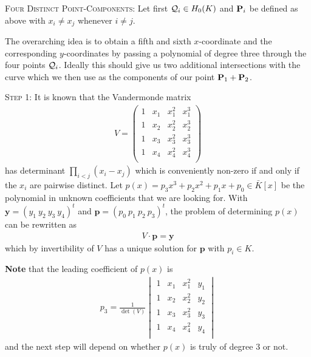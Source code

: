 \documentclass[english,11pt,a4paper]{article}
\begin{document}
\begin{case} {\scshape Four Distinct Point-Components:}
	Let first $\q_i \in \enk$ and $\P_i$ be defined as above with $x_i \neq x_j$ whenever $i \neq j$.

	The overarching idea is to obtain a fifth and sixth $x$-coordinate and the corresponding $y$-coordinates by passing a polynomial of degree three through the four points $\q_i$. Ideally this should give us two additional intersections with the curve which we then use as the components of our point $\P_1 + \P_2$.

	{\scshape Step 1:} It is known that the Vandermonde matrix
	\begin{align*}V=
		\begin{pmatrix}
			1 & x_1 & x_1^2 & x_1^3\\
			1 & x_2 & x_2^2 & x_2^3\\
			1 & x_3 & x_3^2 & x_3^3\\
			1 & x_4 & x_4^2 & x_4^3\\
		\end{pmatrix}
	\end{align*}
	has determinant $\prod_{i < j} (x_i-x_j)$ which is conveniently non-zero if and only if the $x_i$ are pairwise distinct. Let $p(x) = p_3 x^3 + p_2 x^2 + p_1 x + p_0 \in \bar K[x]$ be the polynomial in unknown coefficients that we are looking for. With $\textbf{y} = (y_1 \ y_2 \ y_3 \ y_4)^t$ and $\textbf{p} = (p_0 \ p_1 \ p_2 \ p_3)^t$, the problem of determining $p(x)$ can be rewritten as
	\begin{align*}
		V \cdot \mathbf{p} = \mathbf{y}
	\end{align*}
	which by invertibility of $V$ has a unique solution for $\mathbf{p}$ with $p_i\in K$.

	\textbf{Note} that the leading coefficient of $p(x)$ is
	\begin{align*}
	  p_3 = \frac{1}{\det (V)}
	  \begin{vmatrix}
			1 & x_1 & x_1^2 & y_1\\
			1 & x_2 & x_2^2 & y_2\\
			1 & x_3 & x_3^2 & y_3\\
			1 & x_4 & x_4^2 & y_4\\	  
	  \end{vmatrix}
	\end{align*}
	and the next step will depend on whether $p(x)$ is truly of degree 3 or not.


\end{case}
\end{document}
